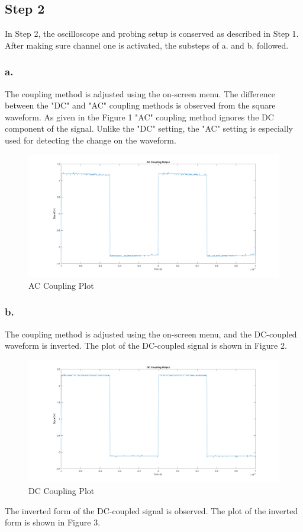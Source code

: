 \documentclass[letterpaper,12pt]{article}
\begin{document}
\subsection{Step 2}
In Step 2, the oscilloscope and probing setup is conserved as described in Step 1. After making sure channel one is activated, the substeps of a. and b. followed.
\subsubsection{a.}
The coupling method is adjusted using the on-screen menu. The difference between the "DC" and "AC" coupling methods is observed from the square waveform. As given in the Figure 1 "AC" coupling method ignores the DC component of the signal. Unlike the "DC" setting, the "AC" setting is especially used for detecting the change on the waveform.
\begin{figure}[H]
	\caption{AC Coupling Plot}
	\centering
	\includegraphics[width=1\textwidth]{2a.png}
\end{figure}

\subsubsection{b.}
The coupling method is adjusted using the on-screen menu, and the DC-coupled waveform is inverted. The plot of the DC-coupled signal is shown in Figure 2.

\begin{figure}[H]
	\caption{DC Coupling Plot}
	\centering
	\includegraphics[width=1\textwidth]{2b1.png}
\end{figure}
The inverted form of the DC-coupled signal is observed. The plot of the inverted form is shown in Figure 3.
\end{document}
